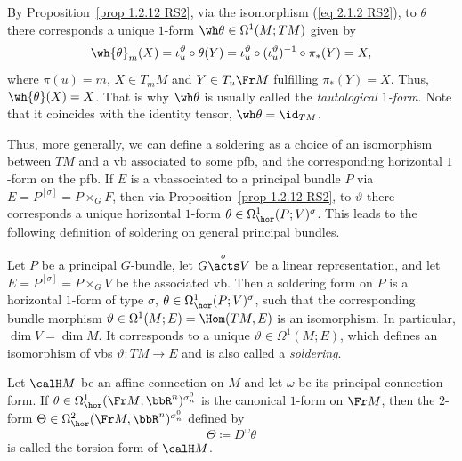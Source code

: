 \begin{rem}
    By Proposition~\ref{prop 1.2.12 RS2}, via the isomorphism (\ref{eq 2.1.2 RS2}), to $\theta$ there corresponds a unique $1$-form $\wh\theta\in\Omega^1(M;TM)$ given by
    \[\wh{\theta}_m(X)=\iota_u^\vartheta\circ \theta(Y)=\iota_u^\vartheta\circ (\iota_u^\vartheta)^{-1}\circ\pi_\ast(Y)=X,\]
    where $\pi(u)=m$, $X\in T_mM$ and $Y\in T_u\Fr M$ fulfilling $\pi_\ast(Y)=X$. Thus, $\wh{\theta}(X)=X$. That is why $\wh\theta$ is usually called the \emph{tautological $1$-form}. Note that it coincides with the identity tensor, $\wh\theta=\id_{TM}$.
\end{rem}

Thus, more generally, we can define a soldering as a choice of an isomorphism between $TM$ and a \gls{vb} associated to some \gls{pfb}, and the corresponding horizontal $1$-form on the \gls{pfb}. If $E$ is a \gls{vb}associated to a principal bundle $P$ via $E=P^{[\sigma]}=P\times_G F$, then via Proposition~\ref{prop 1.2.12 RS2}, to $\vartheta$ there corresponds a unique horizontal $1$-form $\theta\in\Omega^1_{\hor}(P;V)^\sigma$. This leads to the following definition of soldering on general principal bundles.

\begin{defn}\label{def soldering on pfb}
    Let $P$ be a principal $G$-bundle, let $G\overset{\sigma}{\acts}V$ be a linear representation, and let $E=P^{[\sigma]}=P\times_G V$ be the associated \gls{vb}. Then a soldering form on $P$ is a horizontal $1$-form of type $\sigma$, $\theta\in\Omega^1_{\hor}(P;V)^\sigma$, such that the corresponding bundle morphism $\vartheta\in \Omega^1(M;E)=\Hom(TM,E)$ is an isomorphism. In particular, $\dim V=\dim M$. It corresponds to a unique $\vartheta\in\Omega^1(M; E)$, which defines an isomorphism of \glspl{vb} $\vartheta:TM\to E$ and is also called a \emph{soldering}.
\end{defn}


\begin{defn}
    Let $\calH M$ be an affine connection on $M$ and let $\omega$ be its principal connection form. If $\theta\in\Omega^1_{\hor}(\Fr M;\bbR^n)^{\sigma_n^0}$ is the canonical $1$-form on $\Fr M$, then the $2$-form $\Theta\in\Omega^2_{\hor}(\Fr M,\bbR^n)^{\sigma_n^0}$ defined by
    \[\Theta\coloneqq D^\omega\theta\label{eq 2.1.10 RS2}\]
    is called the torsion form of $\calH M$.
\end{defn}


